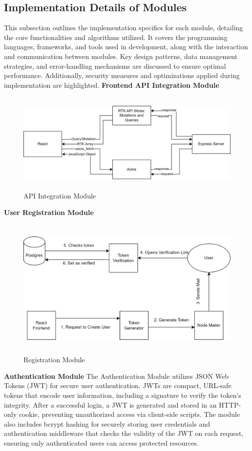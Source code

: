 \subsection{Implementation Details of Modules}
This subsection outlines the implementation specifics for each module, detailing the core functionalities and algorithms utilized. It covers the programming languages, frameworks, and tools used in development, along with the interaction and communication between modules. Key design patterns, data management strategies, and error-handling mechanisms are discussed to ensure optimal performance. Additionally, security measures and optimizations applied during implementation are highlighted.
\newline
\textbf{Frontend API Integration Module}
\begin{figure}[H]
    \centering
     \includegraphics[height = 5cm]{Diagrams/API.png}
     \caption{API Integration Module}
 \end{figure}
\textbf{User Registration Module}
\begin{figure}[H]
    \centering
     \includegraphics[height = 7cm]{Diagrams/register_module.png}
     \caption{Registration Module}
 \end{figure}
\textbf{Authentication Module}
\newline
The Authentication Module utilizes JSON Web Tokens (JWT) for secure user authentication. JWTs are compact, URL-safe tokens that encode user information, including a signature to verify the token's integrity. After a successful login, a JWT is generated and stored in an HTTP-only cookie, preventing unauthorized access via client-side scripts. The module also includes bcrypt hashing for securely storing user credentials and authentication middleware that checks the validity of the JWT on each request, ensuring only authenticated users can access protected resources.
